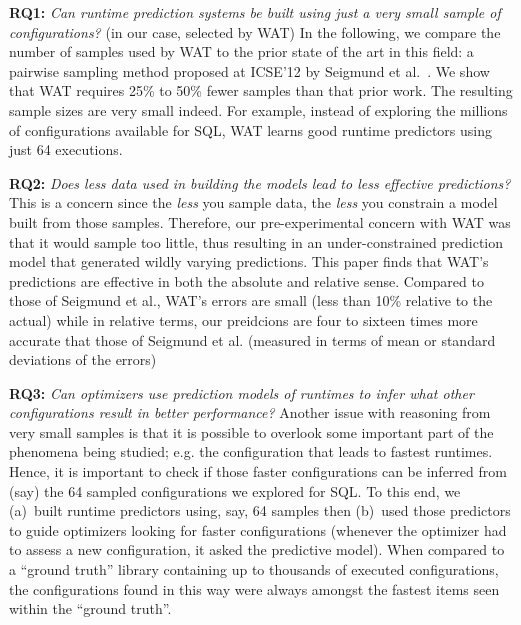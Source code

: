 \documentclass{sig-alternative}
\begin{document}
            {\bf RQ1:} {\em Can runtime prediction systems  be built using just a very small sample of configurations?} (in our case,  selected by WAT)
            In the following, we compare the number of samples used by WAT
              to the prior state of the art in this field: a pairwise sampling method proposed at ICSE'12 by Seigmund et al.~\cite{siegmund2012predicting}. 
              We show that WAT requires  25\% to 50\% fewer samples than that  prior
 work. The resulting sample sizes are very small indeed. For example, instead of exploring
 the millions of configurations available for SQL, WAT learns good runtime predictors using
 just 64 executions.
            
            {\bf RQ2:} {\em Does less data used in building the models lead to less
            effective predictions?}  This is a concern since the {\em less} you sample data,
            the {\em less} you constrain a model built from those samples. Therefore,
            our pre-experimental concern with WAT was that it would sample too
            little, thus resulting in an under-constrained prediction model that generated
            wildly varying predictions.  This paper finds that  WAT's predictions are effective in both the absolute and relative sense. Compared to those of 
            Seigmund et al., WAT's  errors are small (less than 10\% relative
            to the actual) while in relative terms, our preidcions are 
 four to sixteen times more accurate that those of Seigmund et al. (measured in terms of mean or standard deviations of the errors)
          
          {\bf RQ3:} {\em Can optimizers use prediction models of runtimes
            to infer what other configurations result in better  performance?} 
           Another issue with reasoning from very small samples is that it is
           possible to overlook some important
           part of the phenomena being studied; e.g. the configuration that
           leads to fastest runtimes. Hence, it is important to check if those
           faster configurations can be inferred from (say) the 64 sampled configurations
           we explored for SQL. To this end, we (a)~built runtime predictors using, say, 64 samples then (b)~used those predictors to guide optimizers looking for faster
           configurations (whenever
           the optimizer had to assess a new configuration, it   asked the predictive
           model). When compared to  a ``ground truth'' library containing up to thousands of executed configurations, the configurations found in this way were always amongst the fastest items seen within the ``ground truth''.
           
\end{document}
